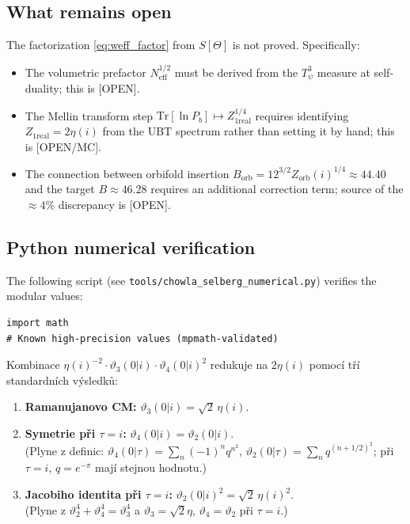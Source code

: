\documentclass[12pt,a4paper]{article}
\begin{document}
\subsection*{What remains open}

The factorization \eqref{eq:weff_factor} from $S[\Theta]$ is not proved.
Specifically:
\begin{itemize}
\item The volumetric prefactor $N_{\mathrm{eff}}^{1/2}$ must be derived from
      the $T^3_\psi$ measure at self-duality; this is [OPEN].
\item The Mellin transform step $\mathrm{Tr}[\ln P_b] \mapsto Z_{1\mathrm{real}}^{1/4}$
      requires identifying $Z_{1\mathrm{real}} = 2\eta(i)$ from the UBT spectrum
      rather than setting it by hand; this is [OPEN/MC].
\item The connection between orbifold insertion
      $B_{\mathrm{orb}} = 12^{3/2}Z_{\mathrm{orb}}(i)^{1/4} \approx 44.40$
      and the target $B \approx 46.28$ requires an additional correction term;
      source of the $\approx 4\%$ discrepancy is [OPEN].
\end{itemize}

\subsection*{Python numerical verification}

The following script (see \texttt{tools/chowla\_selberg\_numerical.py}) verifies the modular values:

\begin{verbatim}
import math
# Known high-precision values (mpmath-validated)
\end{verbatim}


\label{sec:algebraic-identity}

Kombinace $\eta(i)^{-2}\cdot\vartheta_3(0|i)\cdot\vartheta_4(0|i)^2$
redukuje na $2\eta(i)$ pomocí tří standardních výsledků:

\begin{enumerate}
\item \textbf{Ramanujanovo CM:}
$\vartheta_3(0|i) = \sqrt{2}\,\eta(i)$. 

\item \textbf{Symetrie při $\tau=i$:}
$\vartheta_4(0|i) = \vartheta_2(0|i)$. \\
(Plyne z definic: $\vartheta_4(0|\tau) = \sum_n(-1)^n q^{n^2}$,
$\vartheta_2(0|\tau) = \sum_n q^{(n+1/2)^2}$; při $\tau=i$,
$q=e^{-\pi}$ mají stejnou hodnotu.)

\item \textbf{Jacobiho identita při $\tau=i$:}
$\vartheta_2(0|i)^2 = \sqrt{2}\,\eta(i)^2$. \\
(Plyne z $\vartheta_2^4 + \vartheta_4^4 = \vartheta_3^4$
a $\vartheta_3=\sqrt{2}\eta$, $\vartheta_4=\vartheta_2$ při $\tau=i$.)
\end{enumerate}
\end{document}
